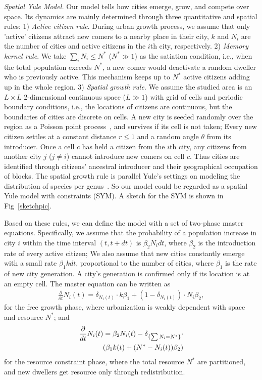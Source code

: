 \documentclass[reprint,unsortedaddress,amsmath,amssymb,aps,prl,showkeys]{revtex4-2}
\begin{document}
\textit{Spatial Yule Model.} Our model tells how cities emerge, grow, and compete over space. Its dynamics are mainly determined through three quantitative and spatial rules: 1) \textit{Active citizen rule}. During urban growth process, we assume that only 'active' citizens attract new comers to a nearby place in their city, $k$ and $N_i$ are the number of cities and active citizens in the $i$th city, respectively. 2) \textit{Memory kernel rule}. We take $\sum_{i} N_i \le N^*$ ($N^* \gg 1$) as the satiation condition, i.e., when the total population exceeds $N^*$, a new comer would deactivate a random dweller who is previously active. This mechanism keeps up to $N^*$ active citizens adding up in the whole region. 3) \emph{Spatial growth rule}. We assume the studied area is an $L\times L$ 2-dimensional continuous space ($L\gg 1$) with grid of cells and periodic boundary conditions, %
i.e., the locations of citizens are continuous, but the boundaries of cities are discrete on cells. A new city is seeded randomly over the region as a Poisson point process~\cite{miles1970homogeneous}, and survives if its cell is not taken; Every new citizen settles at a constant distance $r\le 1$ and a random angle $\theta$ from its introducer. Once a cell $c$ has held a citizen from the $i$th city, any citizens from another city $j$ ($j\ne i$) cannot introduce new comers on cell $c$. Thus cities are identified through citizens' ancestral introducer and their geographical occupation of blocks. The spatial growth rule is parallel Yule's settings on modeling the distribution of species per genus~\cite{yule1925ii}. So our model could be regarded as a spatial Yule model with constraints (SYM). A sketch for the SYM is shown in Fig~\ref{sketchpic}.

Based on these rules, we can define the model with a set of two-phase master equations. Specifically, we assume that the probability of a population increase in city $i$ within the time interval $(t,t+dt)$ is $\beta_2N_idt$, where $\beta_2$ is the introduction rate of every active citizen; We also assume that new cities constantly emerge with a small rate $\beta_1kdt$, proportional to the number of cities, where $\beta_1$ is the rate of new city generation. A city's generation is confirmed only if its location is at an empty cell. The master equation can be written as \begin{align}\frac{\partial}{\partial t}N_i(t) =  \delta_{N_i(t)}\cdot k\beta_1+ (1-\delta_{N_i(t)})\cdot N_i\beta_2, \end{align} for the free growth phase, where urbanization is weakly dependent with space and resource $N^*$;
and \begin{align}
\frac{\partial}{dt} N_i(t) = \beta_2 N_i(t) -\delta_{\{\sum N_i = N^*\}}\cdot\notag \\ \left(\beta_1k(t) + (N^*-N_i(t))\beta_2 \right)
\end{align}
for the resource constraint phase, where the total resource $N^*$ are partitioned, and new dwellers get resource only through redistribution. 
\end{document}
